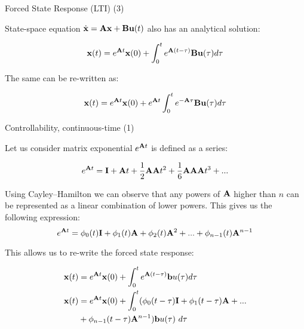 \documentclass{beamer}
\begin{document}
\begin{frame}{Forced State Response (LTI) (3)}
	\begin{flushleft}
		
		State-space equation $\dot{\mathbf{x}} = \mathbf{A}  \mathbf{x} + \mathbf{B}  \mathbf{u}(t)$ also has an analytical solution:
		
		\begin{equation}
			\mathbf{x}(t) = e^{\mathbf{A}t}  \mathbf{x}(0) + 
			\int_{0}^{t} e^{\mathbf{A}(t-\tau)} \mathbf{B}  \mathbf{u}(\tau) d\tau
		\end{equation}
	
		The same can be re-written as:
		
		\begin{equation}
			\mathbf{x}(t) = e^{\mathbf{A}t}  \mathbf{x}(0) + 
			e^{\mathbf{A}t} \int_{0}^{t} e^{-\mathbf{A}\tau} \mathbf{B}  \mathbf{u}(\tau) d\tau
		\end{equation}

	\end{flushleft}
\end{frame}




\begin{frame}{Controllability, continuous-time (1)}
	\begin{flushleft}
		
		Let us consider matrix exponential $e^{\mathbf{A}t}$ is defined as a series:
		
		\begin{equation}
			e^{\mathbf{A}t} = \mathbf{I}+\mathbf{A}t+\frac{1}{2} \mathbf{A}\mathbf{A}t^2
			+\frac{1}{6} \mathbf{A}\mathbf{A}\mathbf{A}t^3 + ...
		\end{equation}
	
		Using Cayley–Hamilton we can observe that any powers of $\mathbf{A}$ higher than $n$ can be represented as a linear combination of lower powers. This gives us the following expression:
		\begin{equation}
			e^{\mathbf{A}t} = \phi_0(t)\mathbf{I}+\phi_1(t)\mathbf{A}+\phi_2(t) \mathbf{A}^2 + ...
 + \phi_{n-1}(t) \mathbf{A}^{n-1}
		\end{equation}
		
		This allows us to re-write the forced state response:
		
		\begin{align*}
			\mathbf{x}(t) &= e^{\mathbf{A}t}  \mathbf{x}(0) + 
			\int_{0}^{t} e^{\mathbf{A}(t-\tau)} \mathbf{b}  u(\tau) d\tau
			\\
			\mathbf{x}(t) &= e^{\mathbf{A}t}  \mathbf{x}(0) + 
			\int_{0}^{t} 
			( \phi_0(t-\tau)\mathbf{I}+\phi_1(t-\tau)\mathbf{A}+ ... 
			\\
			&+ \phi_{n-1}(t-\tau) \mathbf{A}^{n-1} ) 
			\mathbf{b}  u(\tau) \ d\tau
		\end{align*}
		
		
	\end{flushleft}
\end{frame}
\end{document}

